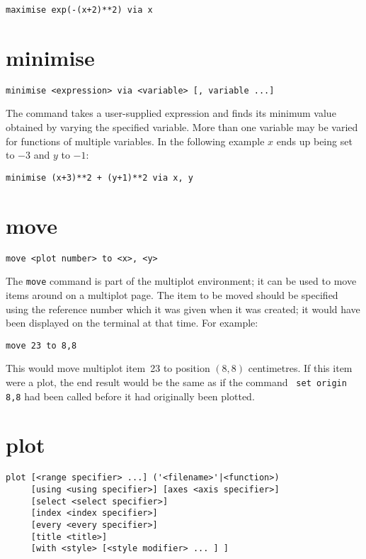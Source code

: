 \begin{verbatim}
maximise exp(-(x+2)**2) via x
\end{verbatim}

\section{minimise}

\begin{verbatim}
minimise <expression> via <variable> [, variable ...]
\end{verbatim}

The  command takes a user-supplied expression and finds its
minimum value obtained by varying the specified variable.  More than one
variable may be varied for functions of multiple variables.  In the following
example $x$ ends up being set to $-3$ and $y$ to $-1$:

\begin{verbatim}
minimise (x+3)**2 + (y+1)**2 via x, y
\end{verbatim}

\section{move}

\begin{verbatim}
move <plot number> to <x>, <y>
\end{verbatim}

The {\tt move} command is part of the multiplot environment; it can be used to
move items around on a multiplot page. The item to be moved should be specified
using the reference number which it was given when it was created; it would
have been displayed on the terminal at that time. For example:

\begin{verbatim}
move 23 to 8,8
\end{verbatim}
  
\noindent This would move multiplot item~23 to position $(8,8)$ centimetres. If
this item were a plot, the end result would be the same as if the command {\tt
set origin 8,8} had been called before it had originally been plotted.

\section{plot}

\begin{verbatim}
plot [<range specifier> ...] ('<filename>'|<function>)
     [using <using specifier>] [axes <axis specifier>]
     [select <select specifier>]
     [index <index specifier>]
     [every <every specifier>]
     [title <title>]
     [with <style> [<style modifier> ... ] ]
\end{verbatim}

